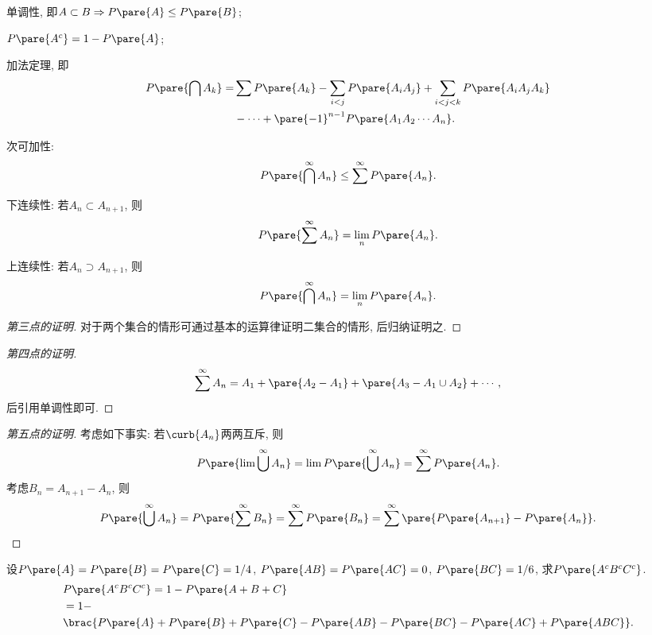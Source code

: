 \documentclass{ctexart}
\begin{document}
\begin{finale}
    \begin{corollary}
        \mbox{}
        \begin{cenum}
            \item 单调性, 即$A\subset B\Rightarrow P\pare{A}\le P\pare{B}$;
            \item $P\pare{A^c} = 1-P\pare{A}$;
            \item 加法定理, 即
            \begin{align*}
                P\pare{\bigcap A_k} =& \sum P\pare{A_k} - \sum_{i<j}P\pare{A_iA_j} + \sum_{i<j<k}P\pare{A_iA_jA_k} \\
                & - \cdots + \pare{-1}^{n-1}P\pare{A_1A_2\cdots A_n}. 
            \end{align*}
            \item 次可加性:
            \[ P\pare{\bigcap^\infty A_n}\le \sum^\infty P\pare{A_n}. \]
            \item 下连续性: 若$A_n\subset A_{n+1}$, 则
            \[ P\pare{\sum^\infty A_n} = \lim_n P\pare{A_n}. \]
            \item 上连续性: 若$A_n \supset A_{n+1}$, 则
            \[ P\pare{\bigcap^\infty A_n} = \lim_n P\pare{A_n}. \]
        \end{cenum}
    \end{corollary}
\end{finale}
\begin{proof}[第三点的证明]
    对于两个集合的情形可通过基本的运算律证明二集合的情形, 后归纳证明之.
\end{proof}
\begin{proof}[第四点的证明]
    \[ \sum^\infty A_n = A_1 + \pare{A_2-A_1} + \pare{A_3 - A_1\cup A_2} + \cdots, \]
    后引用单调性即可.
\end{proof}
\begin{proof}[第五点的证明]
    考虑如下事实: 若$\curb{A_n}$两两互斥, 则
    \[ P\pare{\lim \bigcup^\infty A_n} = \lim P\pare{\bigcup^\infty A_n} = \sum^\infty P\pare{A_n}. \]
    考虑$B_n = A_{n+1} - A_n$, 则
    \[ P\pare{\bigcup^\infty A_n} = P\pare{\sum^\infty B_n} = \sum^\infty P\pare{B_n} = \sum^\infty \pare{P\pare{A_{n+1}} - P\pare{A_n}}. \qedhere \]
\end{proof}
\begin{sample}
    \begin{ex}
        设$P\pare{A} = P\pare{B} = P\pare{C} = 1/4$, $P\pare{AB}= P\pare{AC} = 0$, $P\pare{BC} = 1/6$, 求$P\pare{A^cB^cC^c}$.
        \begin{align*}
            &P\pare{A^cB^cC^c} = 1-P\pare{A+B+C} \\
            &= 1-\\&\brac{P\pare{A} + P\pare{B} + P\pare{C} - P\pare{AB} - P\pare{BC} - P\pare{AC} + P\pare{ABC}}.
        \end{align*}
    \end{ex}
\end{sample}
\end{document}

